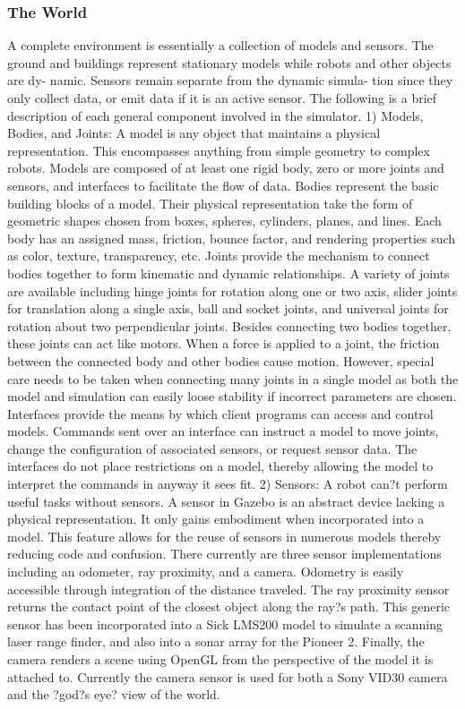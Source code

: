 \subsubsection{The World}
A complete environment is essentially a collection of models and sensors. The ground and buildings represent stationary models while robots and other objects are dy- namic. Sensors remain separate from the dynamic simula- tion since they only collect data, or emit data if it is an active sensor.
The following is a brief description of each general component involved in the simulator.
1) Models, Bodies, and Joints: A model is any object that maintains a physical representation. This encompasses anything from simple geometry to complex robots. Models are composed of at least one rigid body, zero or more joints and sensors, and interfaces to facilitate the flow of data.
Bodies represent the basic building blocks of a model. Their physical representation take the form of geometric shapes chosen from boxes, spheres, cylinders, planes, and lines. Each body has an assigned mass, friction, bounce factor, and rendering properties such as color, texture, transparency, etc.
Joints provide the mechanism to connect bodies together to form kinematic and dynamic relationships. A variety of joints are available including hinge joints for rotation along one or two axis, slider joints for translation along a single axis, ball and socket joints, and universal joints for rotation about two perpendicular joints. Besides connecting two bodies together, these joints can act like motors. When a force is applied to a joint, the friction between the connected body and other bodies cause motion. However, special care needs to be taken when connecting many joints in a single model as both the model and simulation can easily loose stability if incorrect parameters are chosen.
Interfaces provide the means by which client programs can access and control models. Commands sent over an interface can instruct a model to move joints, change the configuration of associated sensors, or request sensor data. The interfaces do not place restrictions on a model, thereby allowing the model to interpret the commands in anyway it sees fit.
2) Sensors: A robot can?t perform useful tasks without sensors. A sensor in Gazebo is an abstract device lacking a physical representation. It only gains embodiment when incorporated into a model. This feature allows for the reuse of sensors in numerous models thereby reducing code and confusion.
There currently are three sensor implementations including an odometer, ray proximity, and a camera. Odometry is easily accessible through integration of the distance traveled. The ray proximity sensor returns the contact point of the closest object along the ray?s path. This generic sensor has been incorporated into a Sick LMS200 model to simulate a scanning laser range finder, and also into a sonar array for the Pioneer 2. Finally, the camera renders a scene using OpenGL from the perspective of the model it is attached to. Currently the camera sensor is used for both a Sony VID30 camera and the ?god?s eye? view of the world.
